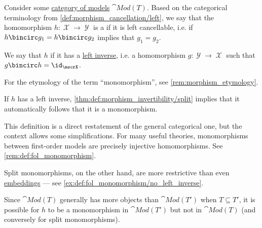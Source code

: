 \begin{definition}\label{def:fol_monomorphism}\mimprovised
  Consider some \hyperref[def:fol_theory_model_functor/obj]{category of models} \( \cat{Mod}(T) \). Based on the categorical terminology from \cref{def:morphism_cancellation/left}, we say that the homomorphism \( h: \mscrX \to \mscrY \) is a  if it is left cancellable, i.e. if \( h \bincirc g_1 = h \bincirc g_2 \) implies that \( g_1 = g_2 \).

  We say that \( h \)  if it has a \hyperref[def:morphism_invertibility/left]{left inverse}, i.e. a homomorphism \( g: \mscrY \to \mscrX \) such that \( g \bincirc h = \id_\mscrX \).
\end{definition}
\begin{comments}
  \item For the etymology of the term \enquote{monomorphism}, see \cref{rem:morphism_etymology}.
\end{comments}
\begin{comments}
  \item If \( h \) has a left inverse, \cref{thm:def:morphism_invertibility/split} implies that it automatically follows that it is a monomorphism.

  \item This definition is a direct restatement of the general categorical one, but the context allows some simplifications. For many useful theories, monomorphisms between first-order models are precisely injective homomorphisms. See \cref{rem:def:fol_monomorphism}.

  Split monomorphisms, on the other hand, are more restrictive than even \hyperref[def:fol_embedding]{embeddings} --- see \cref{ex:def:fol_monomorphism/no_left_inverse}.

  \item Since \( \cat{Mod}(T) \) generally has more objects than \( \cat{Mod}(T') \) when \( T \subseteq T' \), it is possible for \( h \) to be a monomorphism in \( \cat{Mod}(T') \) but not in \( \cat{Mod}(T) \) (and conversely for split monomorphisms).
\end{comments}

